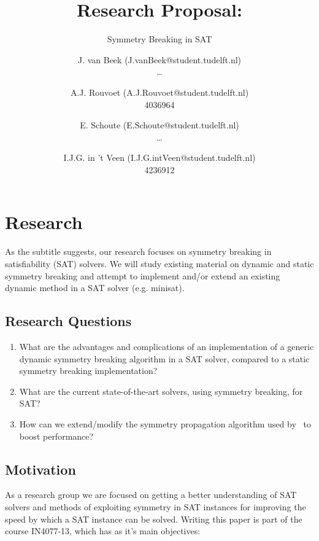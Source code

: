 

	\title{Research Proposal:}
	\author{
		J. van Beek (J.vanBeek@student.tudelft.nl) \\ \ldots \and
		A.J. Rouvoet (A.J.Rouvoet@student.tudelft.nl) \\ 4036964 \and
		E. Schoute (E.Schoute@student.tudelft.nl) \\ \ldots \and
		I.J.G. in 't Veen (I.J.G.intVeen@student.tudelft.nl) \\ 4236912
	}

	\subtitle{Symmetry Breaking in SAT}



	\maketitle
	\newpage

	\section{Research}
	As the subtitle suggests, our research focuses on symmetry breaking in satisfiability (SAT) solvers. We will study existing material on dynamic and static symmetry breaking and attempt to implement and/or extend an existing dynamic method in a SAT solver (e.g. minisat).

		\subsection{Research Questions}
		\begin{enumerate}
		\item What are the advantages and complications of an implementation of a generic dynamic	symmetry breaking algorithm in a SAT solver, compared to a static symmetry breaking implementation?
		\item What are the current state-of-the-art solvers, using symmetry breaking, for SAT?
		\item How can we extend/modify the symmetry propagation algorithm used by~\cite{devriendt2012symmetry} to boost performance?
		\end{enumerate}

		\subsection{Motivation}
			As a research group we are focused on getting a better understanding of SAT solvers and methods of exploiting symmetry in SAT instances for improving the speed by which a SAT	instance can be solved.	Writing this paper is part of the course IN4077-13, which has as it's main objectives:


